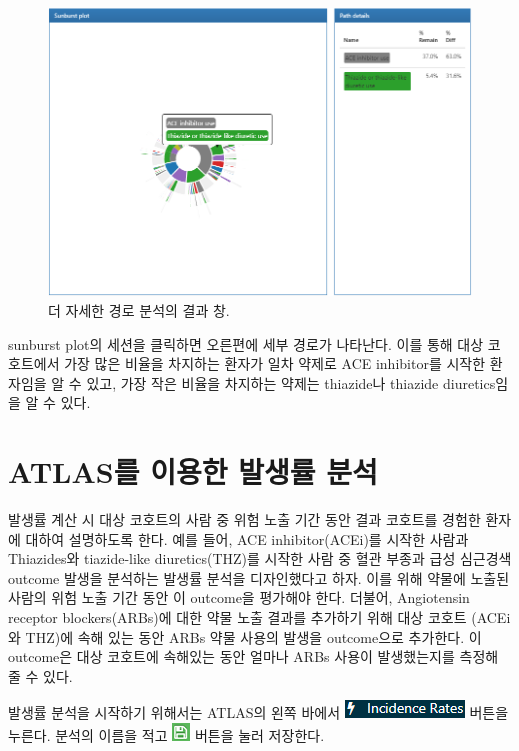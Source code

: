 \documentclass[10.5pt]{book}
\theoremstyle{definition}
\theoremstyle{definition}
\theoremstyle{definition}
\theoremstyle{remark}
\begin{document}
\begin{figure}

{\centering \includegraphics[width=1\linewidth]{images/Characterization/atlasPathwaysResultsPathDetails} 

}

\caption{더 자세한 경로 분석의 결과 창.}\label{fig:atlasPathwaysResultsPathDetails}
\end{figure}

sunburst plot의 세션을 클릭하면 오른편에 세부 경로가 나타난다. 이를 통해
대상 코호트에서 가장 많은 비율을 차지하는 환자가 일차 약제로 ACE
inhibitor를 시작한 환자임을 알 수 있고, 가장 작은 비율을 차지하는 약제는
thiazide나 thiazide diuretics임을 알 수 있다.

\section{ATLAS를 이용한 발생률 분석}\label{atlas---}

발생률 계산 시 대상 코호트의 사람 중 위험 노출 기간 동안 결과 코호트를
경험한 환자에 대하여 설명하도록 한다. 예를 들어, ACE inhibitor(ACEi)를
시작한 사람과 Thiazides와 tiazide-like diuretics(THZ)를 시작한 사람 중
혈관 부종과 급성 심근경색 outcome 발생을 분석하는 발생률 분석을
디자인했다고 하자. 이를 위해 약물에 노출된 사람의 위험 노출 기간 동안 이
outcome을 평가해야 한다. 더불어, Angiotensin receptor blockers(ARBs)에
대한 약물 노출 결과를 추가하기 위해 대상 코호트 (ACEi와 THZ)에 속해 있는
동안 ARBs 약물 사용의 발생을 outcome으로 추가한다. 이 outcome은 대상
코호트에 속해있는 동안 얼마나 ARBs 사용이 발생했는지를 측정해 줄 수
있다.

발생률 분석을 시작하기 위해서는 ATLAS의 왼쪽 바에서
\includegraphics{images/Characterization/atlasIncidenceMenuItem.png}
버튼을 누른다. 분석의 이름을 적고
\includegraphics{images/PopulationLevelEstimation/save.png} 버튼을 눌러
저장한다.
\end{document}
